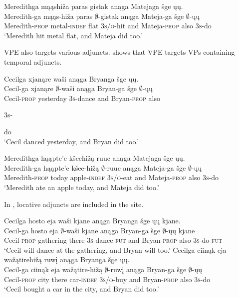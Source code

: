 \documentclass[output=paper]{LSP/langsci}
\begin{document}
\ex\label{ex:johnson:6b} 
\glll Meredithga  {\ob}{\sVP} mąąshiža paras gistak{\cb} anąga Matejaga šge {\ob}ųų{\cb}.\\
Meredith-ga {} mąąs-hiža paras $\emptyset$-gistak anąga Mateja-ga šge $\emptyset$-ųų\\
Meredith-\textsc{prop} {} metal-\textsc{indef} flat \textsc{3s/o}-hit and Mateja-\textsc{prop} also \textsc{3s}-do\\
\trans `Meredith hit metal flat, and Mateja did too.'
\z
\z

VPE also targets various adjuncts.  shows that VPE targets VPs containing temporal adjuncts. 
 
\ea\label{ex:johnson:7}
\ea 
\glll Cecilga {\ob}{\sVP} xjanąre waši{\cb} anąga Bryanga šge {\ob}ųų{\cb}.\\
Cecil-ga {} xjanąre $\emptyset$-waši anąga Bryan-ga šge $\emptyset$-ųų\\
Cecil-\textsc{prop} {} yesterday \textsc{3s}-dance and Bryan-\textsc{prop} also \begin{sc}3s-\end{sc}do\\
\trans `Cecil danced yesterday, and Bryan did too.'

\ex 
\glll Meredithga  {\ob}{\sVP} hąąpte'e kšeehižą ruuc{\cb} anąga Matejaga šge {\ob}ųų{\cb}.\\
Meredith-ga {} hąąpte'e kšee-hižą $\emptyset$-ruuc anąga Mateja-ga šge $\emptyset$-ųų\\
Meredith-\textsc{prop} {} today apple-\textsc{indef  3s/o}-eat and Mateja-\textsc{prop} also \textsc{3s}-do\\
\trans `Meredith ate an apple today, and Mateja did too.'
\z
\z

In , locative adjuncts are included in the  site. 
 
\ea\label{ex:johnson:8}
\ea 
\glll Cecilga {\ob}{\sVP} hosto eja waši{\cb} kjane anąga Bryanga šge {\ob}ųų{\cb} kjane.\\
Cecil-ga {} hosto eja $\emptyset$-waši kjane anąga Bryan-ga šge $\emptyset$-ųų kjane\\
Cecil-\textsc{prop} {} gathering there \textsc{3s}-dance \textsc{fut} and Bryan-\textsc{prop} also \textsc{3s}-do \textsc{fut}\\
\trans `Cecil will dance at the gathering, and Bryan will too.'
\ex 
\glll Cecilga {\ob} {\sVP} ciinąk eja wažątirehižą ruwį{\cb} anąga Bryanga šge {\ob}ųų{\cb}.\\
Cecil-ga {} ciinąk eja wažątire-hižą $\emptyset$-ruwį anąga Bryan-ga šge $\emptyset$-ųų\\
Cecil-\textsc{prop} {} city there car-\textsc{indef} \textsc{3s/o}-buy and Bryan-\textsc{prop} also \textsc{3s}-do\\
\trans `Cecil bought a car in the city, and Bryan did too.'
\z
\z
\end{document}
